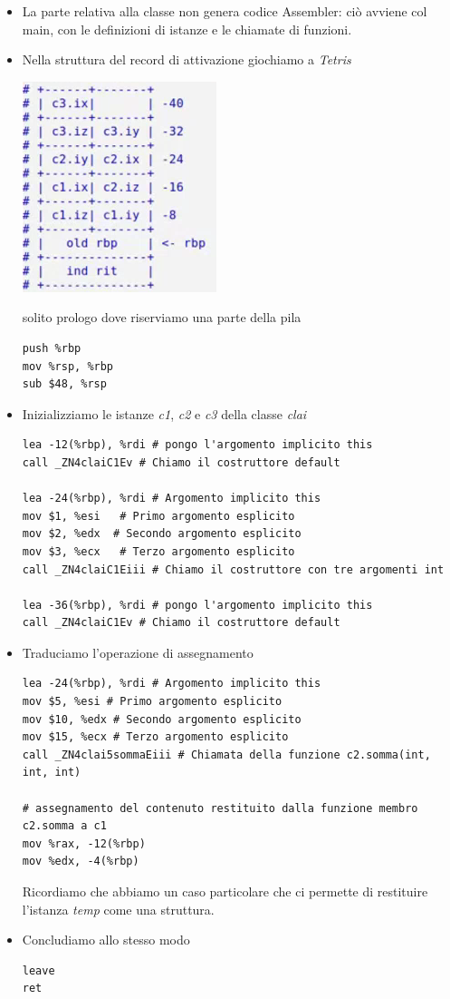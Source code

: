 \documentclass[11pt]{report}
\theoremstyle{definition}
\begin{document}
\begin{itemize}
\item La parte relativa alla classe non genera codice Assembler: ciò avviene col main, con le definizioni di istanze e le chiamate di funzioni.
\item Nella struttura del record di attivazione giochiamo a \emph{Tetris}
\begin{center}
\includegraphics[scale=.9]{img/42.PNG}
\end{center}  
solito prologo dove riserviamo una parte della pila
\begin{verbatim}
push %rbp
mov %rsp, %rbp
sub $48, %rsp
\end{verbatim}
\item Inizializziamo le istanze \emph{c1}, \emph{c2} e \emph{c3} della classe \emph{clai}
\begin{verbatim}
lea -12(%rbp), %rdi # pongo l'argomento implicito this
call _ZN4claiC1Ev # Chiamo il costruttore default
      
lea -24(%rbp), %rdi # Argomento implicito this
mov $1, %esi   # Primo argomento esplicito
mov $2, %edx  # Secondo argomento esplicito
mov $3, %ecx   # Terzo argomento esplicito
call _ZN4claiC1Eiii # Chiamo il costruttore con tre argomenti int
      
lea -36(%rbp), %rdi # pongo l'argomento implicito this
call _ZN4claiC1Ev # Chiamo il costruttore default
\end{verbatim}
\item Traduciamo l'operazione di assegnamento
\begin{verbatim}
lea -24(%rbp), %rdi # Argomento implicito this
mov $5, %esi # Primo argomento esplicito
mov $10, %edx # Secondo argomento esplicito
mov $15, %ecx # Terzo argomento esplicito
call _ZN4clai5sommaEiii # Chiamata della funzione c2.somma(int, int, int)
      
# assegnamento del contenuto restituito dalla funzione membro c2.somma a c1
mov %rax, -12(%rbp) 
mov %edx, -4(%rbp)
\end{verbatim}
Ricordiamo che abbiamo un caso particolare che ci permette di restituire l'istanza \emph{temp} come una struttura.
\item Concludiamo allo stesso modo
\begin{verbatim}
leave
ret
\end{verbatim}
\end{itemize}
\endgroup
\end{document}

